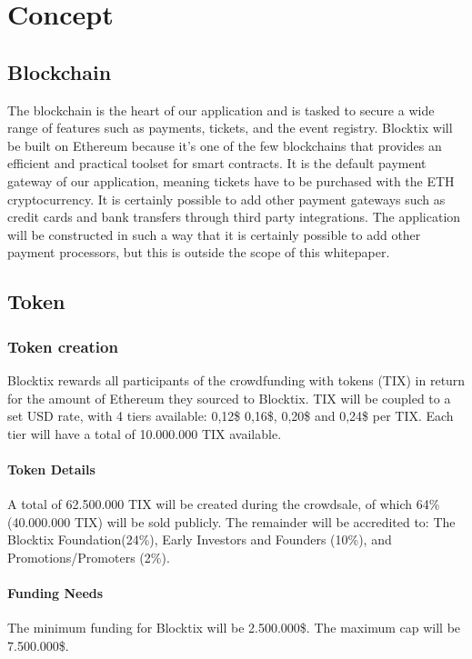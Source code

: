 \documentclass[a4paper]{article}
\begin{document}
\section{Concept}
\subsection{Blockchain}
The blockchain is the heart of our application and is tasked to secure a wide range of features such as payments, tickets, and the event registry. Blocktix will be built on Ethereum\cite{vb2013eth} because it's one of the few blockchains that provides an efficient and practical toolset for smart contracts. It is the default payment gateway of our application, meaning tickets have to be purchased with the ETH cryptocurrency. It is certainly possible to add other payment gateways such as credit cards and bank transfers through third party integrations. The application will be constructed in such a way that it is certainly possible to add other payment processors, but this is outside the scope of this whitepaper.


\subsection{Token}
\subsubsection{Token creation}
Blocktix rewards all participants of the crowdfunding with tokens (TIX) in return for the amount of Ethereum they sourced to Blocktix. TIX will be coupled to a set USD rate, with 4 tiers available: 0,12\$ 0,16\$, 0,20\$ and 0,24\$ per TIX. Each tier will have a total of 10.000.000 TIX available. 

\paragraph{Token Details}
A total of 62.500.000 TIX will be created during the crowdsale, of which 64\% (40.000.000 TIX) will be sold publicly. The remainder will be accredited to: The Blocktix Foundation(24\%), Early Investors and Founders (10\%), and Promotions/Promoters (2\%).

\paragraph{Funding Needs}
The minimum funding for Blocktix will be 2.500.000\$. The maximum cap will be 7.500.000\$.
\end{document}
